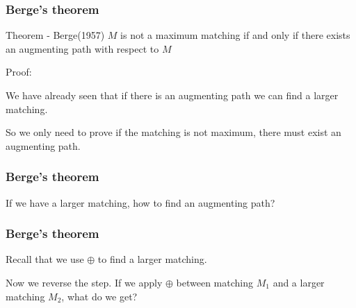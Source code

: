 \documentclass[hyperref={pdfpagelabels=false}]{beamer}
\begin{document}
%			
%			
%			

\frame
{
	\frametitle{Berge's theorem}
	
	\begin{block}{Theorem - Berge(1957)}
		$M$ is not a maximum matching if and only if there exists an augmenting path with respect to $M$
	\end{block}	
	
	\begin{itemize}
	{
		\item Proof:
		
		We have already seen that if there is an augmenting path we can find a larger matching. 
		
		\bigskip
		
		So we only need to prove if the matching is not maximum, there must exist an augmenting path.
	}
	\end{itemize}
	
}

\frame
{
	\frametitle{Berge's theorem}
	
	\huge{If we have a larger matching, how to find an augmenting path?}
	
}

\frame
{
	\frametitle{Berge's theorem}
	
	\large{
	Recall that we use $\oplus$ to find a larger matching.
	
	\bigskip
	
	Now we reverse the step. If we apply $\oplus$ between matching $M_{1}$ and a larger matching $M_{2}$, what do we get?
	}
}
\end{document}
